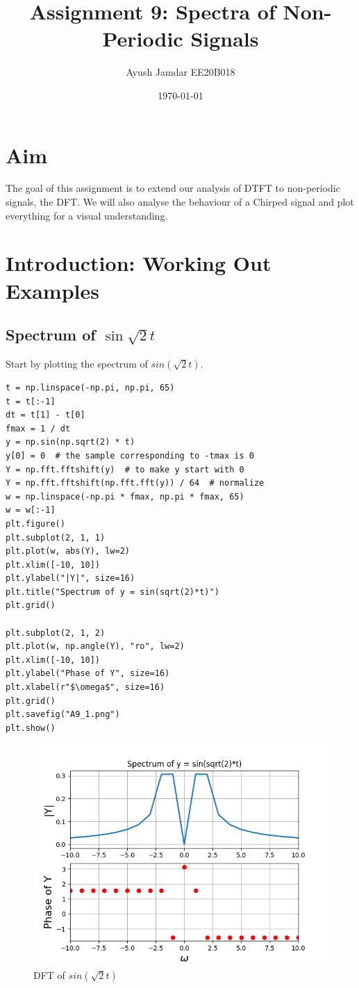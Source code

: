 \documentclass[11pt, a4paper]{article}
\title{Assignment 9: Spectra of Non-Periodic Signals}
\author{Ayush Jamdar EE20B018} %
\date{\today} %
\begin{document}
		
		
\maketitle %
\section{Aim}
The goal of this assignment is to extend our analysis of DTFT to non-periodic signals, the DFT. We will also analyse the behaviour of a Chirped signal and plot everything for a visual understanding.  
  
\section{Introduction: Working Out Examples}
\subsection{Spectrum of $\sin\sqrt{2}t$}
Start by plotting the spectrum of $sin(\sqrt{2}t)$.

\begin{verbatim}
t = np.linspace(-np.pi, np.pi, 65)
t = t[:-1]
dt = t[1] - t[0]
fmax = 1 / dt
y = np.sin(np.sqrt(2) * t)
y[0] = 0  # the sample corresponding to -tmax is 0
Y = np.fft.fftshift(y)  # to make y start with 0
Y = np.fft.fftshift(np.fft.fft(y)) / 64  # normalize
w = np.linspace(-np.pi * fmax, np.pi * fmax, 65)
w = w[:-1]
plt.figure()
plt.subplot(2, 1, 1)
plt.plot(w, abs(Y), lw=2)
plt.xlim([-10, 10])
plt.ylabel("|Y|", size=16)
plt.title("Spectrum of y = sin(sqrt(2)*t)")
plt.grid()

plt.subplot(2, 1, 2)
plt.plot(w, np.angle(Y), "ro", lw=2)
plt.xlim([-10, 10])
plt.ylabel("Phase of Y", size=16)
plt.xlabel(r"$\omega$", size=16)
plt.grid()
plt.savefig("A9_1.png")
plt.show()

\end{verbatim}

\begin{figure}[!tbh]
   	\centering
  \includegraphics[scale=0.5]{A9_1.png} 
    \caption{DFT of $sin(\sqrt{2}t)$} 	
   \end{figure}   
   
\end{document}
